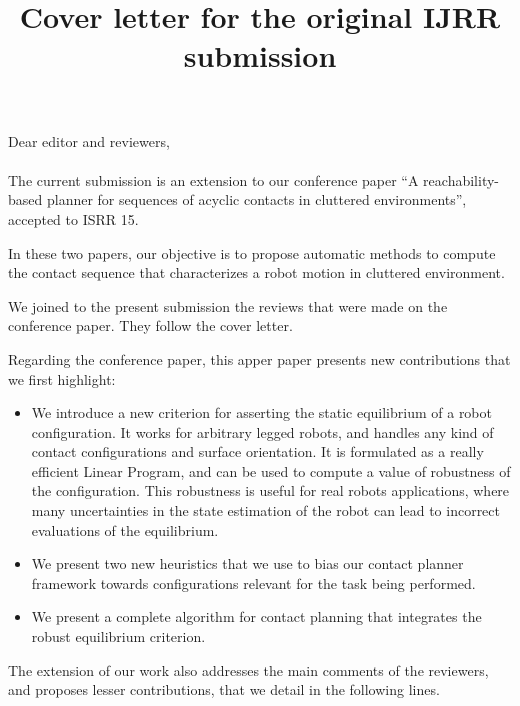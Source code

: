 \documentclass[a4paper]{article}
\author {}
\title {Cover letter for the original IJRR submission}
\date {}
\begin{document}
\maketitle

Dear editor and reviewers, \\ \\

The current submission is an extension to our conference paper ``A reachability-based planner for sequences of acyclic contacts in
cluttered environments'', accepted to ISRR 15.

In these two papers, our objective is to propose automatic methods
to compute the contact sequence that characterizes a robot motion in
cluttered environment.

We joined to the present submission the reviews that were made on the
conference paper. They follow the cover letter.

Regarding the conference paper, this apper paper presents new contributions that we first highlight:

\begin{itemize}
\item We introduce a new criterion for asserting the static equilibrium of a robot configuration. It works for arbitrary
legged robots, and handles any kind of contact configurations and surface orientation. It is formulated as a really efficient Linear Program, and 
can be used to compute a value of robustness of the configuration. This robustness is useful for real robots applications, where many uncertainties
in the state estimation of the robot can lead to incorrect evaluations of the equilibrium.
\item We present two new heuristics that we use to bias our contact planner framework towards configurations relevant for the task being performed.
\item We present a complete algorithm for contact planning that integrates the robust equilibrium criterion.
\end{itemize}

The extension of our work also addresses the main comments of the reviewers, and proposes lesser contributions,
that we detail in the following lines.
\end{document}
